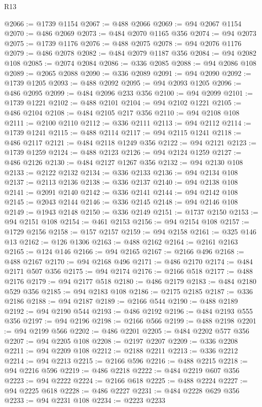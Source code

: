 \begin{lexlean}{R13}
\begin{coremodule}
@2066 := @1739 @1154
@2067 := @488 @2066
@2069 := @94 @2067 @1154
@2070 := @486 @2069
@2073 := @484 @2070 @1165 @356
@2074 := @94 @2073
@2075 := @1739 @1176
@2076 := @488 @2075
@2078 := @94 @2076 @1176
@2079 := @486 @2078
@2082 := @484 @2079 @1187 @356
@2084 := @94 @2082 @108
@2085 := @2074 @2084
@2086 := @336 @2085
@2088 := @94 @2086 @108
@2089 := @2065 @2088
@2090 := @336 @2089
@2091 := @94 @2090
@2092 := @1739 @1205
@2093 := @488 @2092
@2095 := @94 @2093 @1205
@2096 := @486 @2095
@2099 := @484 @2096 @233 @356
@2100 := @94 @2099
@2101 := @1739 @1221
@2102 := @488 @2101
@2104 := @94 @2102 @1221
@2105 := @486 @2104
@2108 := @484 @2105 @217 @356
@2110 := @94 @2108 @108
@2111 := @2100 @2110
@2112 := @336 @2111
@2113 := @94 @2112
@2114 := @1739 @1241
@2115 := @488 @2114
@2117 := @94 @2115 @1241
@2118 := @486 @2117
@2121 := @484 @2118 @1249 @356
@2122 := @94 @2121
@2123 := @1739 @1259
@2124 := @488 @2123
@2126 := @94 @2124 @1259
@2127 := @486 @2126
@2130 := @484 @2127 @1267 @356
@2132 := @94 @2130 @108
@2133 := @2122 @2132
@2134 := @336 @2133
@2136 := @94 @2134 @108
@2137 := @2113 @2136
@2138 := @336 @2137
@2140 := @94 @2138 @108
@2141 := @2091 @2140
@2142 := @336 @2141
@2144 := @94 @2142 @108
@2145 := @2043 @2144
@2146 := @336 @2145
@2148 := @94 @2146 @108
@2149 := @1943 @2148
@2150 := @336 @2149
@2151 := @1737 @2150
@2153 := @94 @2151 @108
@2154 := @461 @2153
@2156 := @94 @2154 @108
@2157 := @1729 @2156
@2158 := @157 @2157
@2159 := @94 @2158
@2161 := @325 @146 @13
@2162 := @126 @1306
@2163 := @488 @2162
@2164 := @2161 @2163
@2165 := @124 @146
@2166 := @94 @2165
@2167 := @2166 @496
@2168 := @488 @2167
@2170 := @94 @2168 @496
@2171 := @486 @2170
@2174 := @484 @2171 @507 @356
@2175 := @94 @2174
@2176 := @2166 @518
@2177 := @488 @2176
@2179 := @94 @2177 @518
@2180 := @486 @2179
@2183 := @484 @2180 @529 @356
@2185 := @94 @2183 @108
@2186 := @2175 @2185
@2187 := @336 @2186
@2188 := @94 @2187
@2189 := @2166 @544
@2190 := @488 @2189
@2192 := @94 @2190 @544
@2193 := @486 @2192
@2196 := @484 @2193 @555 @356
@2197 := @94 @2196
@2198 := @2166 @566
@2199 := @488 @2198
@2201 := @94 @2199 @566
@2202 := @486 @2201
@2205 := @484 @2202 @577 @356
@2207 := @94 @2205 @108
@2208 := @2197 @2207
@2209 := @336 @2208
@2211 := @94 @2209 @108
@2212 := @2188 @2211
@2213 := @336 @2212
@2214 := @94 @2213
@2215 := @2166 @596
@2216 := @488 @2215
@2218 := @94 @2216 @596
@2219 := @486 @2218
@2222 := @484 @2219 @607 @356
@2223 := @94 @2222
@2224 := @2166 @618
@2225 := @488 @2224
@2227 := @94 @2225 @618
@2228 := @486 @2227
@2231 := @484 @2228 @629 @356
@2233 := @94 @2231 @108
@2234 := @2223 @2233

\end{coremodule}
\end{lexlean}
